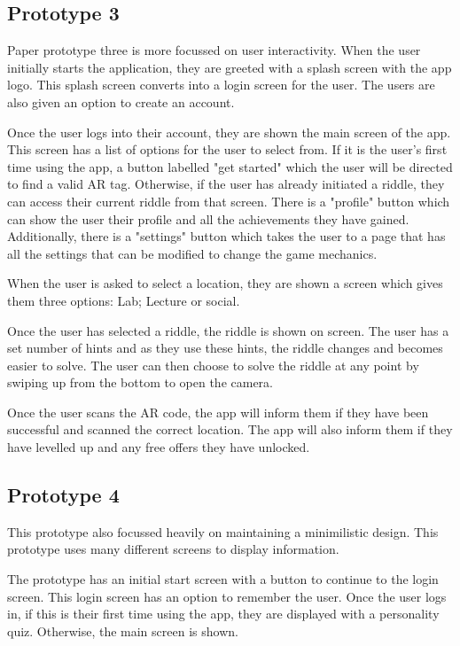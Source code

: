 \documentclass[10pt,twocolumn]{article} %
\begin{document}
\subsection*{Prototype 3}
Paper prototype three is more focussed on user interactivity. When the user initially starts the application, they are greeted with a splash screen with the app logo. This splash screen converts into a login screen for the user. The users are also given an option to create an account.

Once the user logs into their account, they are shown the main screen of the app. This screen has a list of options for the user to select from. If it is the user's first time using the app, a button labelled "get started" which the user will be directed to find a valid AR tag. Otherwise, if the user has already initiated a riddle, they can access their current riddle from that screen. There is a "profile" button which can show the user their profile and all the achievements they have gained. Additionally, there is a "settings" button which takes the user to a page that has all the settings that can be modified to change the game mechanics.

When the user is asked to select a location, they are shown a screen which gives them three options: Lab; Lecture or social.

Once the user has selected a riddle, the riddle is shown on screen. The user has a set number of hints and as they use these hints, the riddle changes and becomes easier to solve. The user can then choose to solve the riddle at any point by swiping up from the bottom to open the camera. 

Once the user scans the AR code, the app will inform them if they have been successful and scanned the correct location. The app will also inform them if they have levelled up and any free offers they have unlocked.

\subsection*{Prototype 4}
This prototype also focussed heavily on maintaining a minimilistic design. This prototype uses many different screens to display information. 

The prototype has an initial start screen with a button to continue to the login screen. This login screen has an option to remember the user. Once the user logs in, if this is their first time using the app, they are displayed with a personality quiz. Otherwise, the main screen is shown.
\end{document}

